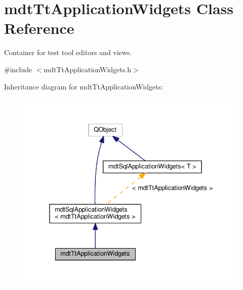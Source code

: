 \hypertarget{classmdt_tt_application_widgets}{\section{mdt\-Tt\-Application\-Widgets Class Reference}
\label{classmdt_tt_application_widgets}
}


Container for test tool editors and views.  




{\ttfamily \#include $<$mdt\-Tt\-Application\-Widgets.\-h$>$}



Inheritance diagram for mdt\-Tt\-Application\-Widgets\-:\nopagebreak
\begin{figure}[H]
\begin{center}
\leavevmode
\includegraphics[width=338pt]{classmdt_tt_application_widgets__inherit__graph}
\end{center}
\end{figure}


